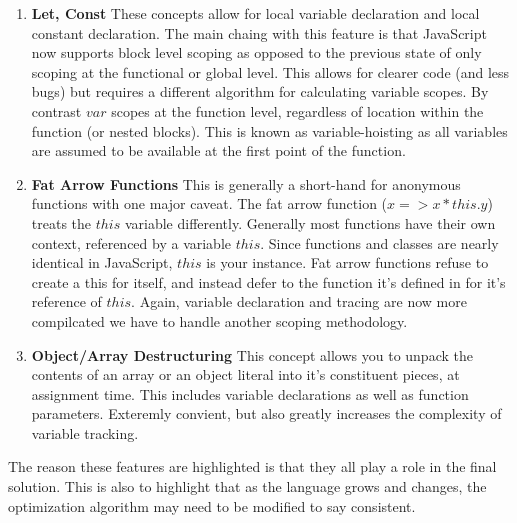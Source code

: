   \begin{enumerate}
    \item \textbf{Let, Const} These concepts allow for local variable declaration and local constant declaration.  The main chaing with this feature is that JavaScript now supports block level scoping as opposed to the previous state of only scoping at the functional or global level.  This allows for clearer code (and less bugs) but requires a different algorithm for calculating variable scopes.  By contrast $var$ scopes at the function level, regardless of location within the function (or nested blocks).  This is known as variable-hoisting as all variables are assumed to be available at the first point of the function.
    \item \textbf{Fat Arrow Functions} This is generally a short-hand for anonymous functions with one major caveat.  The fat arrow function ($x => x * this.y$) treats the $this$ variable differently.  Generally most functions have their own context, referenced by a variable $this$.  Since functions and classes are nearly identical in JavaScript, $this$ is your instance.  Fat arrow functions refuse to create a this for itself, and instead defer to the function it's defined in for it's reference of $this$. Again, variable declaration and tracing are now more compilcated we have to handle another scoping methodology.
    \item \textbf{Object/Array Destructuring}  This concept allows you to unpack the contents of an array or an object literal into it's constituent pieces, at assignment time.  This includes variable declarations as well as function parameters.  Exteremly convient, but also greatly increases the complexity of variable tracking.  
  \end{enumerate}

The reason these features are highlighted is that they all play a role in the final solution.  This is also to highlight that as the language grows and changes, the optimization algorithm may need to be modified to say consistent. 
